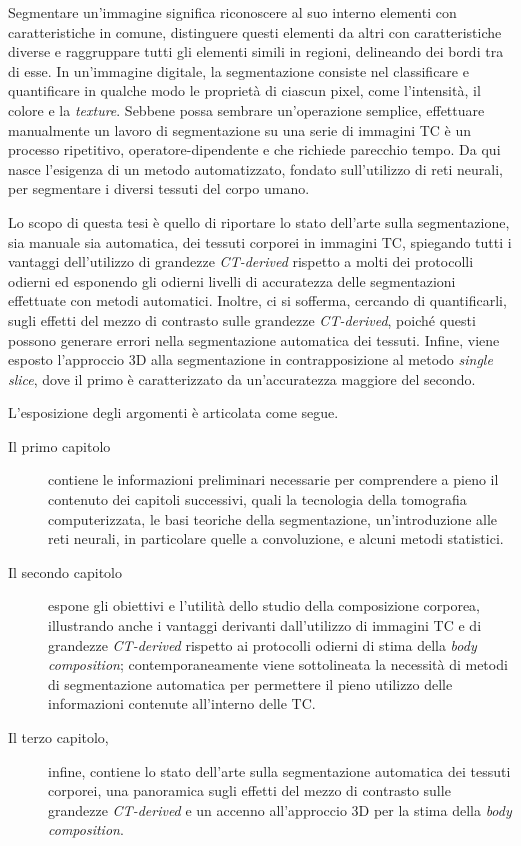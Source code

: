 Segmentare un’immagine significa riconoscere al suo interno elementi con caratteristiche in comune, distinguere questi elementi da altri con caratteristiche diverse e raggruppare tutti gli elementi simili in regioni, delineando dei bordi tra di esse. In un’immagine digitale, la segmentazione consiste nel classificare e quantificare in qualche modo le proprietà di ciascun pixel, come l’intensità, il colore e la \textit{texture}. Sebbene possa sembrare un’operazione semplice, effettuare manualmente un lavoro di segmentazione su una serie di immagini TC è un processo ripetitivo, operatore-dipendente e che richiede parecchio tempo. Da qui nasce l’esigenza di un metodo automatizzato, fondato sull'utilizzo di reti neurali, per segmentare i diversi tessuti del corpo umano.

Lo scopo di questa tesi è quello di riportare lo stato dell'arte sulla segmentazione, sia manuale sia automatica, dei tessuti corporei in immagini TC, spiegando tutti i vantaggi dell'utilizzo di grandezze \textit{CT-derived} rispetto a molti dei protocolli odierni ed esponendo gli odierni livelli di accuratezza delle segmentazioni effettuate con metodi automatici. Inoltre, ci si sofferma, cercando di quantificarli, sugli effetti del mezzo di contrasto sulle grandezze \textit{CT-derived}, poiché questi possono generare errori nella segmentazione automatica dei tessuti. Infine, viene esposto l'approccio 3D alla segmentazione in contrapposizione al metodo \textit{single slice}, dove il primo è caratterizzato da un'accuratezza maggiore del secondo.

L'esposizione degli argomenti è articolata come segue.
\begin{description}
\item[Il primo capitolo] contiene le informazioni preliminari necessarie per comprendere a pieno il contenuto dei capitoli successivi, quali la tecnologia della tomografia computerizzata, le basi teoriche della segmentazione, un'introduzione alle reti neurali, in particolare quelle a convoluzione, e alcuni metodi statistici.
\item[Il secondo capitolo] espone gli obiettivi e l'utilità dello studio della composizione corporea, illustrando anche i vantaggi derivanti dall'utilizzo di immagini TC e di grandezze \textit{CT-derived} rispetto ai protocolli odierni di stima della \textit{body composition}; contemporaneamente viene sottolineata la necessità di metodi di segmentazione automatica per permettere il pieno utilizzo delle informazioni contenute all'interno delle TC.
\item[Il terzo capitolo,] infine, contiene lo stato dell'arte sulla segmentazione automatica dei tessuti corporei, una panoramica sugli effetti del mezzo di contrasto sulle grandezze \textit{CT-derived} e un accenno all'approccio 3D per la stima della \textit{body composition}.
\end{description}


